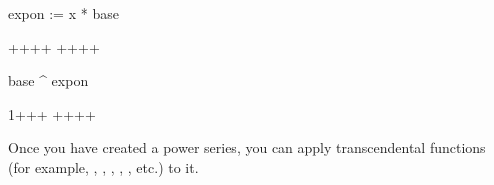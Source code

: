 {{{{{{{{{{{{{{\begin{xtc}
\begin{xtccomment}
\end{xtccomment}
\begin{spadsrc}
expon := x * base 
\end{spadsrc}
\begin{TeXOutput}
\begin{fricasmath}{4}
++++%
++++%
\end{fricasmath}
\end{TeXOutput}
\end{xtc}
%
\begin{xtc}
\begin{xtccomment}
\end{xtccomment}
\begin{spadsrc}
base ^ expon 
\end{spadsrc}
\begin{TeXOutput}
\begin{fricasmath}{5}
1++\TIMES {}+%
\TIMES {}+\TIMES {}+\TIMES {}+\TIMES {}+%
\end{fricasmath}
\end{TeXOutput}
\end{xtc}


Once you have created a power series, you can apply transcendental
functions
(for example, , , , ,
, etc.) to it.

}}}}}}}}}}}}}}
